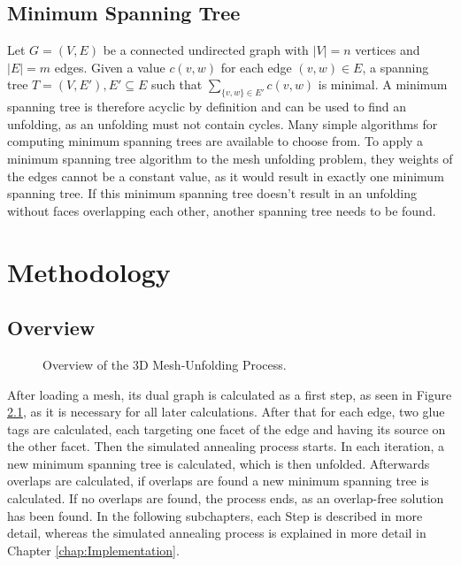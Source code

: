 \documentclass[draft,final]{vutinfth} %
\begin{document}
\section{Minimum Spanning Tree}

Let $G = (V,E)$ be a connected undirected graph with $|V| = n$ vertices and $|E| = m$ edges. Given a value $c(v,w)$ for each edge $(v,w) \in E$, a spanning tree $T = (V,E'), E' \subseteq E$ such that $\sum_{\{v,w\}\in E'} c(v,w)$ is minimal\cite{cheriton1976finding}. A minimum spanning tree is therefore acyclic by definition and can be used to find an unfolding, as an unfolding must not contain cycles. Many simple algorithms for computing minimum spanning trees are available to choose from. To apply a minimum spanning tree algorithm to the mesh unfolding problem, they weights of the edges cannot be a constant value, as it would result in exactly one minimum spanning tree. If this minimum spanning tree doesn't result in an unfolding without faces overlapping each other, another spanning tree needs to be found.

\chapter{Methodology}
\label{chap:methodology}

\section{Overview}

\begin{figure}

\caption{Overview of the 3D Mesh-Unfolding Process.}
\label{fig:overview}
\end{figure}

After loading a mesh, its dual graph is calculated as a first step, as seen in Figure \ref{fig:overview}, as it is necessary for all later calculations. After that for each edge, two glue tags are calculated, each targeting one facet of the edge and having its source on the other facet. Then the simulated annealing process starts. In each iteration, a new minimum spanning tree is calculated, which is then unfolded. Afterwards overlaps are calculated, if overlaps are found a new minimum spanning tree is calculated. If no overlaps are found, the process ends, as an overlap-free solution has been found. In the following subchapters, each Step is described in more detail, whereas the simulated annealing process is explained in more detail in Chapter \ref{chap:Implementation}.
\end{document}
